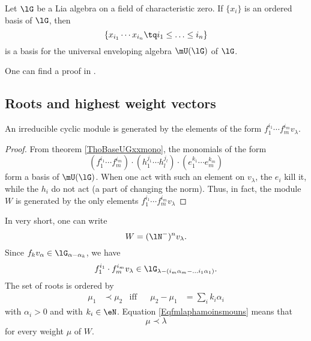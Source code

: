 \begin{theorem}     \label{ThoBaseUGxxmono}
    Let $\lG$ be a Lia algebra on a field of characteristic zero. If $\{ x_i \}$ is an ordered basis of $\lG$, then
    \begin{equation}
        \{ x_{i_1}\cdots x_{i_n}\tq i_1\leq\ldots\leq i_n \}
    \end{equation}
    is a basis for the universal enveloping algebra $\mU(\lG)$ of $\lG$.
\end{theorem}
One can find a proof in \cite{DirkEnvFiniteDimNilLieAlg}. 

                    \subsection{Roots and highest weight vectors}

\begin{proposition}     \label{PropoIrrrgenffflamble}
An irreducible cyclic module is generated by the elements of the form $f_1^{i_1}\cdots f_m^{i_m}v_{\lambda}$.
\end{proposition}

\begin{proof}
    From theorem \ref{ThoBaseUGxxmono}, the monomials of the form
    \begin{equation}
        (f_1^{i_1}\cdots f_m^{i_m})\cdot (h_1^{j_1}\cdots h_l^{j_l})\cdot (e_1^{k_1}\cdots e_m^{k_m})
    \end{equation}
    form a basis of $\mU(\lG)$. When one act with such an element on $v_{\lambda}$, the $e_i$ kill it, while the $h_i$ do not act (a part of changing the norm). Thus, in fact, the module $W$ is generated by the only elements $f_1^{i_1}\cdots f_m^{i_m}v_{\lambda}$
\end{proof}
In very short, one can write
\begin{equation}        \label{EqWnmoinvlambldarootmodul}
    W=(\lN^-)^nv_{\lambda}.
\end{equation}
Since $f_kv_{\alpha}\in\lG_{\alpha-\alpha_k}$, we have
\begin{equation}        \label{Eqfmlaphamoinsmouns}
    f_1^{i_1}\cdot f_m^{i_m}v_{\lambda}\in\lG_{\lambda-(i_m\alpha_m-\ldots i_1\alpha_1)}.
\end{equation}
The set of roots is ordered by
\begin{equation}
    \begin{aligned}
        \mu_1&\prec\mu_2    &   \text{iff}  &&  \mu_2-\mu_1&=\sum_i k_i\alpha_i
    \end{aligned}
\end{equation}
with $\alpha_i>0$ and with $k_i\in\eN$. Equation \eqref{Eqfmlaphamoinsmouns} means that 
\begin{equation}
    \mu\prec\lambda
\end{equation}
for every weight $\mu$ of $W$.

